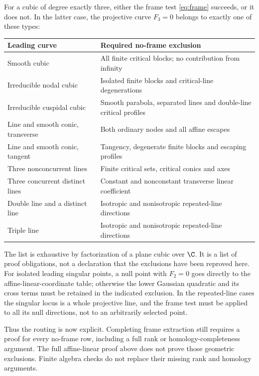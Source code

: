 For a cubic of degree exactly three, either the frame test
\eqref{eq:frame} succeeds, or it does not. In the latter case,
the projective curve $F_3=0$ belongs to exactly one of these types:
\begin{center}\small
\begin{tabular}{@{}p{}p{}@{}}
\toprule
Leading curve & Required no-frame exclusion\\
\midrule
Smooth cubic & All finite critical blocks; no contribution from infinity\\
Irreducible nodal cubic & Isolated finite blocks and critical-line degenerations\\
Irreducible cuspidal cubic & Smooth parabola, separated lines and double-line critical profiles\\
Line and smooth conic, transverse & Both ordinary nodes and all affine escapes\\
Line and smooth conic, tangent & Tangency, degenerate finite blocks and escaping profiles\\
Three nonconcurrent lines & Finite critical sets, critical conics and axes\\
Three concurrent distinct lines & Constant and nonconstant transverse linear coefficient\\
Double line and a distinct line & Isotropic and nonisotropic repeated-line directions\\
Triple line & Isotropic and nonisotropic repeated-line directions\\
\bottomrule
\end{tabular}
\end{center}
The list is exhaustive by factorization of a plane cubic over $\C$.
It is a list of proof obligations, not a declaration that the exclusions
have been reproved here. For isolated leading singular points, a null
point with $F_2=0$ goes directly to the affine-linear-coordinate table;
otherwise the lower Gaussian quadratic and its cross terms must be
retained in the indicated exclusion. In the repeated-line cases the
singular locus is a whole projective line, and the frame test must be
applied to all its null directions, not to an arbitrarily selected point.

Thus the routing is now explicit. Completing frame extraction still
requires a proof for every no-frame row, including a full rank or
homology-completeness argument. The full affine-linear proof above does not prove those geometric
exclusions. Finite algebra checks do not replace their missing
rank and homology arguments.

